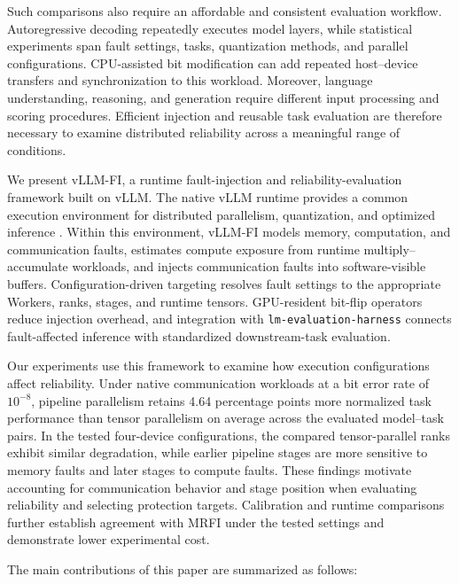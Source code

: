 Such comparisons also require an affordable and consistent evaluation workflow. Autoregressive decoding repeatedly executes model layers, while statistical experiments span fault settings, tasks, quantization methods, and parallel configurations. CPU-assisted bit modification can add repeated host--device transfers and synchronization to this workload. Moreover, language understanding, reasoning, and generation require different input processing and scoring procedures. Efficient injection and reusable task evaluation are therefore necessary to examine distributed reliability across a meaningful range of conditions.

We present vLLM-FI, a runtime fault-injection and reliability-evaluation framework built on vLLM. The native vLLM runtime provides a common execution environment for distributed parallelism, quantization, and optimized inference \cite{kwon2023efficient}. Within this environment, vLLM-FI models memory, computation, and communication faults, estimates compute exposure from runtime multiply--accumulate workloads, and injects communication faults into software-visible buffers. Configuration-driven targeting resolves fault settings to the appropriate Workers, ranks, stages, and runtime tensors. GPU-resident bit-flip operators reduce injection overhead, and integration with \texttt{lm-evaluation-harness} connects fault-affected inference with standardized downstream-task evaluation.

Our experiments use this framework to examine how execution configurations affect reliability. Under native communication workloads at a bit error rate of $10^{-8}$, pipeline parallelism retains 4.64 percentage points more normalized task performance than tensor parallelism on average across the evaluated model--task pairs. In the tested four-device configurations, the compared tensor-parallel ranks exhibit similar degradation, while earlier pipeline stages are more sensitive to memory faults and later stages to compute faults. These findings motivate accounting for communication behavior and stage position when evaluating reliability and selecting protection targets. Calibration and runtime comparisons further establish agreement with MRFI under the tested settings and demonstrate lower experimental cost.

The main contributions of this paper are summarized as follows:

